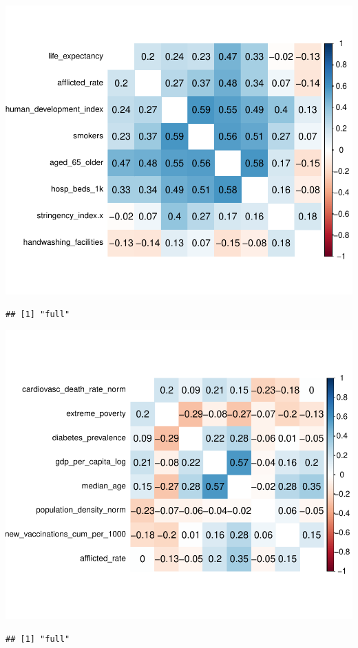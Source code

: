 \documentclass[11pt,preprint, authoryear]{elsarticle}
\numberwithin{equation}{section}
\numberwithin{figure}{section}
\numberwithin{table}{section}
\begin{document}
\includegraphics{Cross_Section_Assignment_files/figure-latex/cor_plot-1.pdf}

\begin{verbatim}
## [1] "full"
\end{verbatim}

\includegraphics{Cross_Section_Assignment_files/figure-latex/core_plot2-1.pdf}

\begin{verbatim}
## [1] "full"
\end{verbatim}
\end{document}
